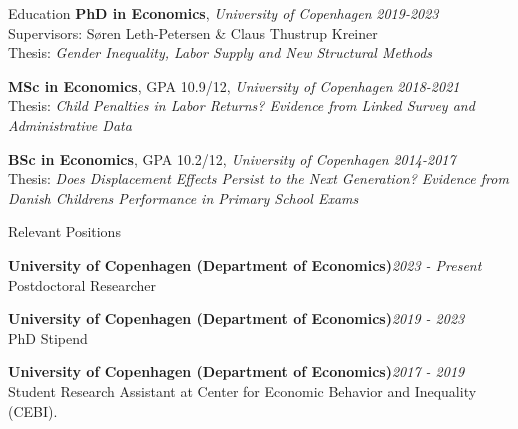 \documentclass[
	11pt, %
]{resume} %
\begin{document}

\begin{rSection}{Education}
    \textbf{PhD in Economics}, \textit{University of Copenhagen} \hfill \textit{2019-2023} \\
    Supervisors: Søren Leth-Petersen \& Claus Thustrup Kreiner \\
    Thesis: \textit{Gender Inequality, Labor Supply and New Structural Methods}

    \textbf{MSc in Economics}, GPA 10.9/12, \textit{University of Copenhagen} \hfill \textit{2018-2021} \\
    Thesis: \textit{Child Penalties in Labor Returns? Evidence from Linked Survey and Administrative Data}

    \textbf{BSc in Economics}, GPA 10.2/12, \textit{University of Copenhagen} \hfill \textit{2014-2017} \\
    Thesis: \textit{Does Displacement Effects Persist to the Next Generation? Evidence from Danish Childrens Performance in Primary School Exams}
\end{rSection}


\begin{rSection}{Relevant Positions}

    \textbf{University of Copenhagen (Department of Economics)}\hfill \textit{2023 - Present} \\
    Postdoctoral Researcher

    \textbf{University of Copenhagen (Department of Economics)}\hfill \textit{2019 - 2023} \\
    PhD Stipend

    \textbf{University of Copenhagen (Department of Economics)}\hfill \textit{2017 - 2019} \\
    Student Research Assistant at Center for Economic Behavior and Inequality (CEBI).

\end{rSection}


\end{document}
